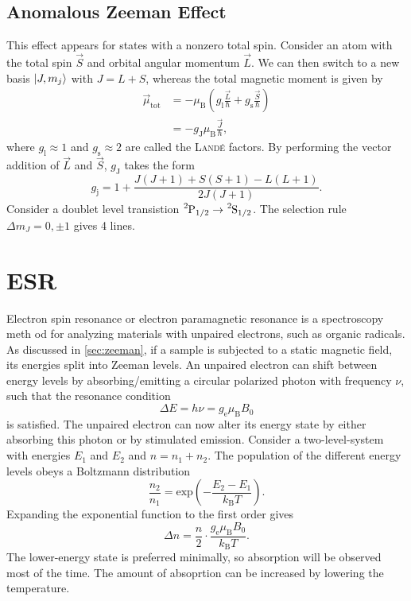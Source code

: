 \subsection{Anomalous Zeeman Effect}
This effect appears for states with a nonzero total spin.
Consider an atom with the total spin $\vec{S}$ and orbital angular momentum $\vec{L}$.
We can then switch to a new basis $\left|J, m_j\right\rangle$ with $J=L+S$, whereas the total magnetic moment is given by
\begin{align*}
	\vec{\mu}_\text{tot} &= -\mu_\text{B}\left(g_\text{l}\frac{\vec{L}}{\hbar} + g_\text{s}\frac{\vec{S}}{\hbar}\right) \\
	&= -g_\text{J}\mu_\text{B}\frac{\vec{J}}{\hbar},
\end{align*}
where $g_\text{l}\approx 1$ and $g_\text{s}\approx 2$ are called the \textsc{Landé} factors.
By performing the vector addition of $\vec{L}$ and $\vec{S}$, $g_\text{J}$ takes the form
\begin{equation*}
	g_\text{j} = 1+\frac{J(J+1)+S(S+1)-L(L+1)}{2J(J+1)}.
\end{equation*}
Consider a doublet level transistion $\ce{^{2}P}_{1/2}\rightarrow \ce{^{2}S}_{1/2}$.
The selection rule $\Delta m_J =0, \pm 1$ gives 4 lines.

\section{ESR}\label{sec:esr}
Electron spin resonance or electron paramagnetic resonance is a spectroscopy meth%
od for analyzing materials with unpaired electrons, such as organic radicals.
As discussed in \autoref{sec:zeeman}, if a sample is subjected to a static magnetic field, its energies split into Zeeman levels.
An unpaired electron can shift between energy levels by absorbing/emitting a circular polarized photon with frequency $\nu$, such that the resonance condition
\begin{equation}\label{eq:resonance}
	\Delta E = h\nu = g_\text{e}\mu_\text{B}B_0
\end{equation}
is satisfied. %
The unpaired electron can now alter its energy state by either absorbing this photon or by stimulated emission.
Consider a two-level-system with energies $E_1$ and $E_2$ and $n=n_1+n_2$.
The population of the different energy levels obeys a Boltzmann distribution
\begin{equation*}
	\frac{n_2}{n_1}=\text{exp}\left(-\frac{E_2-E_1}{k_\text{B}T}\right).
\end{equation*}
Expanding the exponential function to the first order gives
\begin{equation*}
	\Delta n = \frac{n}{2}\cdot\frac{g_\text{e}\mu_\text{B}B_0}{k_\text{B}T}.
\end{equation*}
The lower-energy state is preferred minimally, so absorption will be observed most of the time.
The amount of absoprtion can be increased by lowering the temperature.

